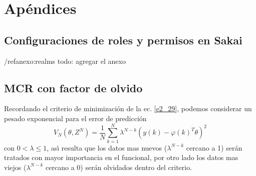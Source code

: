 \renewcommand{\thesection}{A.\arabic{section}}
\renewcommand{\theequation}{a.\arabic{equation}}
\renewcommand{\thefigure}{A.\arabic{figure}}

\chapter{Ap{\'e}ndices}

\section{Configuraciones de roles y permisos en Sakai} /ref{anexo:realms}
todo: agregar el anexo

\section{MCR con factor de olvido}\label{A_1}
Recordando el criterio de minimizaci{\'o}n de la ec. \ref{e2_29}, podemos considerar un pesado exponencial para
el error de predicci{\'o}n
\begin{equation}
  V_N\left(\theta,Z^N\right)=\frac{1}{N}\sum_{k=1}^{N}\lambda^{N-k}\left(y(k)-\varphi(k)^T\theta\right)^2
\end{equation}
con $0<\lambda\leq1$, as{\'\i} resulta que los datos mas nuevos ($\lambda^{N-k}$ cercano a 1) ser{\'a}n tratados con
mayor importancia en el funcional, por otro lado los datos mas viejos ($\lambda^{N-k}$ cercano a 0) ser{\'a}n
olvidados dentro del criterio.

